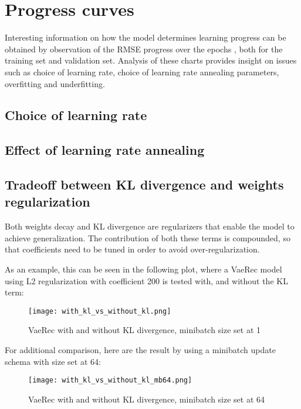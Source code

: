 \section{Progress curves}

Interesting information on how the model determines learning progress
can be obtained by observation of the RMSE progress over the epochs , both for the
training set and validation set. 
Analysis of these charts provides insight on issues such as choice of learning rate,
choice of learning rate annealing parameters, overfitting and underfitting.

\subsection{Choice of learning rate}

\subsection{Effect of learning rate annealing}

\subsection{Tradeoff between KL divergence and weights regularization}

Both weights decay and KL divergence are regularizers that enable the model to achieve
generalization. The contribution of both these terms is compounded, so that 
coefficients need to be tuned in order to avoid over-regularization.

As an example, this can be seen in the following plot, where a VaeRec model
using L2 regularization with coefficient 200 is tested with, and without
the KL term:

\begin{figure}[H]
\texttt{[image: with\_kl\_vs\_without\_kl.png]}
\caption{VaeRec with and without KL divergence, minibatch size set at 1}
\end{figure}

For additional comparison, here are the result by using a minibatch update schema
with size set at 64:

\begin{figure}[H]
\texttt{[image: with\_kl\_vs\_without\_kl\_mb64.png]}
\caption{VaeRec with and without KL divergence, minibatch size set at 64}
\end{figure}

